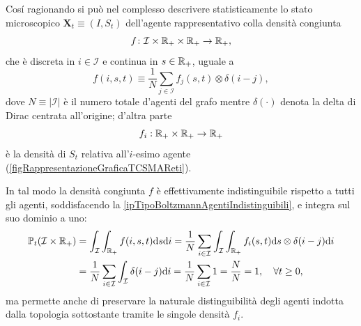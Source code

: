         Cosí ragionando si può nel complesso descrivere statisticamente lo stato microscopico \(\mathbf X_t\equiv(I,S_t)\) dell'agente rappresentativo colla densità congiunta
        \begin{equation*}
          f\colon\mathcal I\times\mathbb R_+\times\mathbb R_+\to\mathbb R_+,
        \end{equation*}
        che è discreta in \(i\in\mathcal I\) e continua in \(s\in\mathbb R_+\), uguale a
        \begin{equation}
          \label{eqDensitàCongiuntaUrbana}
          f(i,s,t)\equiv\frac1N\sum_{j\in\mathcal I}f_j(s,t)\otimes\delta(i-j),
        \end{equation}
        dove \(N\equiv\vert\mathcal I\vert\) è il numero totale d'agenti del grafo mentre \(\delta(\cdot)\) denota la delta di Dirac centrata all'origine; d'altra parte
        \begin{equation*}
          f_i:\mathbb R_+\times\mathbb R_+\rightarrow\mathbb R_+
        \end{equation*}
        è la densità di \(S_t\) relativa all'\(i\)-esimo agente (\cref{figRappresentazioneGraficaTCSMAReti}).

        In tal modo la densità congiunta \(f\) è effettivamente indistinguibile rispetto a tutti gli agenti, soddisfacendo la \ref{ipTipoBoltzmannAgentiIndistinguibili}, e integra sul suo dominio a uno:
        \begin{equation*}
          \begin{aligned}
            \mathbb P_t(\mathcal I\times\mathbb R_+)
            &=\int_{\mathcal I}\int_{\mathbb R_+}f(i,s,t)\mathrm{d} s\mathrm{d} i
            =\frac1N\sum_{i\in\mathcal I}\int_{\mathcal I}\int_{\mathbb R_+}
            f_i(s,t)\mathrm{d} s\otimes\delta(i-j)\mathrm{d} i
            \\&=\frac1N\sum_{i\in\mathcal I}\int_{\mathcal I}\delta(i-j)\mathrm{d} i
            =\frac1N\sum_{i\in\mathcal I}1=\frac NN=1,
            \quad\forall t\geq0,
          \end{aligned}
        \end{equation*}
        ma permette anche di preservare la naturale distinguibilità degli agenti indotta dalla topologia sottostante tramite le singole densità \(f_i\).

